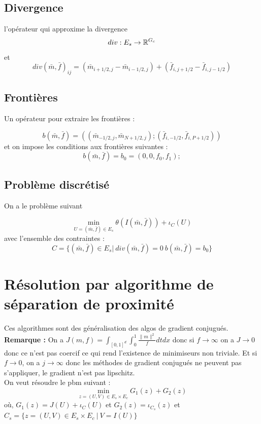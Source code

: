 \documentclass[a4paper,12pt]{article}
\begin{document}
\subsection{Divergence}
l'opérateur qui approxime la divergence
$$
div : E_s\rightarrow \mathbb{R}^{G_c}
$$
et 
$$
div(\bar{m},\bar{f})_{ij} = (\bar{m}_{i+1/2,j}-\bar{m}_{i-1/2,j}) + (\bar{f}_{i,j+1/2}-\bar{f}_{i,j-1/2})
$$

\subsection{Frontières}
Un opérateur pour extraire les frontières : 

$$
b(\bar{m},\bar{f}) = ((\bar{m}_{-1/2,j},\bar{m}_{N+1/2,j});(\bar{f}_{i,-1/2},\bar{f}_{i,P+1/2}))
$$
et on impose les conditions aux frontières suivantes : 
$$
b(\bar{m},\bar{f}) = b_0=(0,0,f_0,f_1);
$$

\subsection{Problème discrétisé}

On a le problème suivant 

$$
\min_{U=(\bar{m},\bar{f})\in E_s} \theta(I(\bar{m},\bar{f})) + \iota_C(U)
$$
avec l'ensemble des contraintes :
$$
C=\{(\bar{m},\bar{f})\in E_s|\ div(\bar{m},\bar{f}) = 0\ b(\bar{m},\bar{f}) = b_0 \}
$$

\section{Résolution par algorithme de séparation de proximité}
Ces algorithmes sont des généralisation des algos de gradient conjugués. \\

\textbf{Remarque : } On a $J(m,f)=\int_{[0,1]^d}\int_0^1 \frac{\|m\|^2}{f} dtdx$ donc si $f\rightarrow\infty$ on a $J\rightarrow 0$ donc ce n'est pas coercif ce qui rend l'existence de minimiseurs non triviale. Et si $f\rightarrow 0$, on a $j\rightarrow \infty$ donc les méthodes de gradient conjugués ne peuvent pas s'appliquer, le gradient n'est pas lipschitz. \\

On veut résoudre le pbm suivant : 
$$
\min_{z=(U,V)\in E_s\times E_c} G_1(z)+G_2(z)
$$
où, $G_1(z) = J(U)+\iota_C(U)$ et $G_2(z)=\iota_{C_s}(z)$ et $C_s=\{z=(U,V)\in E_s\times E_c\ | \ V=I(U) \}$


\\
\end{document}

